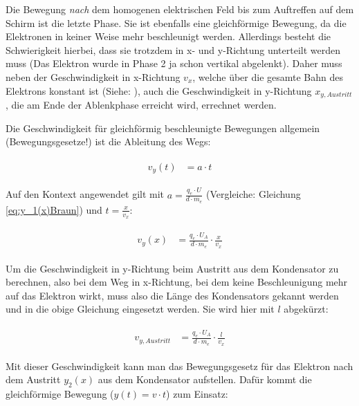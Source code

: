Die Bewegung \emph{nach} dem homogenen elektrischen Feld bis zum Auftreffen auf dem Schirm ist die letzte Phase. Sie ist ebenfalls eine gleichförmige Bewegung, da die Elektronen in keiner Weise mehr beschleunigt werden. Allerdings besteht die Schwierigkeit hierbei, dass sie trotzdem in x- und y-Richtung unterteilt werden muss (Das Elektron wurde in Phase 2 ja schon vertikal abgelenkt). Daher muss neben der Geschwindigkeit in x-Richtung $v_x$, welche über die gesamte Bahn des Elektrons konstant ist (Siehe: ), auch die Geschwindigkeit in y-Richtung $x_{y,Austritt}$, die am Ende der Ablenkphase erreicht wird, errechnet werden. 

Die Geschwindigkeit für gleichförmig beschleunigte Bewegungen allgemein (Bewegungsgesetze!) ist die Ableitung des Wegs:

\begin{align} \label{eq:v(t)Allgemein}
\begin{split}
	v_y(t) &= a \cdot t
\end{split}
\end{align}

\noindent Auf den Kontext angewendet gilt mit $a = \frac{q_e \cdot U}{d \cdot m_e}$ (Vergleiche: Gleichung \ref{eq:y_1(x)Braun}) und $t=\frac{x}{v_x}$:

\begin{align} \label{eq:v(x)Kontext}
\begin{split}
	v_y(x) &= \frac{q_e \cdot U_A}{d \cdot m_e} \cdot \frac{x}{v_x}
\end{split}
\end{align}

\noindent Um die Geschwindigkeit in y-Richtung beim Austritt aus dem Kondensator zu berechnen, also bei dem Weg in x-Richtung, bei dem keine Beschleunigung mehr auf das Elektron wirkt, muss also die Länge des Kondensators gekannt werden und in die obige Gleichung eingesetzt werden. Sie wird hier mit $l$ abgekürzt:

\begin{align} \label{eq:v(t)Gesamt}
\begin{split}
	v_{y,Austritt} &= \frac{q_e \cdot U_A}{d \cdot m_e} \cdot \frac{l}{v_x}
\end{split}
\end{align}

\noindent Mit dieser Geschwindigkeit kann man das Bewegungsgesetz für das Elektron nach dem Austritt $y_2(x)$ aus dem Kondensator aufstellen. Dafür kommt die gleichförmige Bewegung ($y(t) = v \cdot t$) zum Einsatz:

